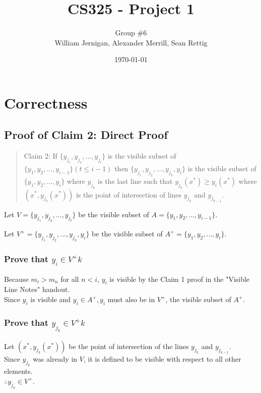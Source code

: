 \documentclass{article}
\title{CS325 - Project 1}
\author{Group \#6 \\ William Jernigan, Alexander Merrill, Sean Rettig}
\date{\today}
\begin{document}
\maketitle

\section*{Correctness}
\subsection*{Proof of Claim 2: Direct Proof}

\begin{quote}
Claim 2: If $\{y_{j_1}, y_{j_2},...,y_{j_{t}}\}$ is the visible subset of $\{y_1, y_2,...,y_{i - 1}\} (t \leq i - 1)$ then $\{y_{j_1}, y_{j_2},...,y_{j_{k}}, y_i\}$ is the visible subset of $\{y_1, y_2,...,y_{i}\}$ where $y_{j_{k}}$ is the last line such that $y_{j_{k}} (x^*) \geq y_i (x^*)$ where $(x^*, y_{j_{k}}(x^*))$ is the point of intersection of lines $y_{j_{k}}$ and $y_{j_{k - 1}}$.
\end{quote}

Let $V=\{y_{j_1}, y_{j_2},...,y_{j_{t}}\}$ be the visible subset of $A=\{y_1, y_2,...,y_{i - 1}\}$.

Let $V^+=\{y_{j_1}, y_{j_2},...,y_{j_{k}}, y_i\}$ be the visible subset of $A^+=\{y_1, y_2,...,y_{i}\}$.

\subsubsection*{Prove that $y_{i} \in V^+k$}
Because $m_i > m_n$ for all $n < i$, $y_i$ is visible by the Claim 1 proof in the "Visible Line Notes" handout.\\
Since $y_i$ is visible and $y_i \in A^+, y_i$ must also be in $V^+$, the visible subset of $A^+$.

\subsubsection*{Prove that $y_{j_k} \in V^+k$}
Let $(x^*, y_{j_k} (x^*))$ be the point of intersection of the lines $y_{j_k}$ and $y_{j_{k-1}}$.\\
Since $y_{j_k}$ was already in $V$, it is defined to be visible with respect to all other elements.\\
$\therefore y_{j_k} \in V^+$.
\end{document}
